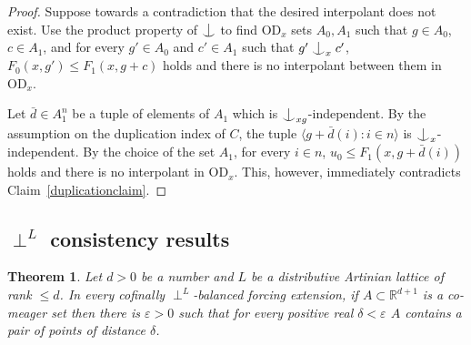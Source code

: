 \documentclass{article}
\newcommand{\eps}{\varepsilon}
\newcommand{\vd}{\mathrm{OD}}
\newcommand{\forkindep}[1][]{%
  \mathrel{
    \mathop{
      \vcenter{
        \hbox{\oalign{\noalign{\kern-.3ex}\hfil$\vert$\hfil\cr
              \noalign{\kern-.7ex}
              $\smile$\cr\noalign{\kern-.3ex}}}
      }
    }\displaylimits_{#1}
  }
}
\newtheorem{theorem}{Theorem}[section]
\theoremstyle{definition}
\begin{document}
\begin{proof}
Suppose towards a contradiction that the desired interpolant does not exist. Use the product property of $\forkindep$ to find $\vd_x$ sets $A_0, A_1$ such that $g\in A_0$, $c\in A_1$, and for every $g'\in A_0$ and $c'\in A_1$ such that $g'\forkindep_x c'$, $F_0(x, g')\leq F_1(x, g+c)$ holds and there is no interpolant between them in $\vd_x$.

Let $\bar d\in A_1^n$ be a tuple of elements of $A_1$ which is $\forkindep_{xg}$-independent. By the assumption on the duplication index of $C$, the tuple $\langle g+\bar d(i)\colon i\in n\rangle$ is $\forkindep_x$-independent. By the choice of the set $A_1$, for every $i\in n$, $u_0\leq F_1(x, g+\bar d(i))$ holds and there is no interpolant in $\vd_x$. This, however, immediately contradicts Claim~\ref{duplicationclaim}.
\end{proof}



\subsection{$\perp^L$ consistency results}

\begin{theorem}
\label{altheorem}
Let $d>0$ be a number and $L$ be a distributive Artinian lattice of rank $\leq d$. In every cofinally $\perp^L$-balanced forcing extension, if $A\subset\mathbb{R}^{d+1}$ is a co-meager set then there is $\eps>0$ such that for every positive real $\delta<\eps$ $A$ contains a pair of points of distance $\delta$.
\end{theorem}
\end{document}
